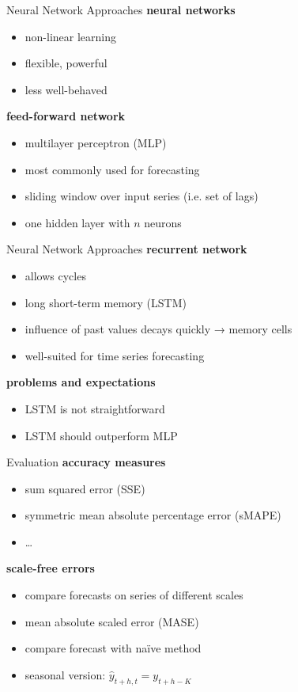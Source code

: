 \documentclass{beamer}
\begin{document}
  
  \begin{frame}{Neural Network Approaches}
    \textbf{neural networks}
    \begin{itemize}
     \item non-linear learning
     \item flexible, powerful
     \item less well-behaved
    \end{itemize}
    
    \textbf{feed-forward network}
    \begin{itemize}
     \item multilayer perceptron (MLP) 
     \item most commonly used for forecasting
     \item sliding window over input series (i.e. set of lags)
     \item one hidden layer with \(n\) neurons
    \end{itemize}
  \end{frame}

  
  \begin{frame}{Neural Network Approaches}
    \textbf{recurrent network}
    \begin{itemize}
     \item allows cycles
     \item long short-term memory (LSTM)
     \item influence of past values decays quickly → memory cells
     \item well-suited for time series forecasting
    \end{itemize}
    
    \textbf{problems and expectations}
    \begin{itemize}
     \item LSTM is not straightforward
     \item LSTM should outperform MLP
    \end{itemize}
  \end{frame}

  
  \begin{frame}{Evaluation}
    \textbf{accuracy measures}
    \begin{itemize}
     \item sum squared error (SSE)
     \item symmetric mean absolute percentage error (sMAPE)
     \item \ldots
    \end{itemize}
   
    \textbf{scale-free errors}
    \begin{itemize}
     \item compare forecasts on series of different scales 
     \item mean absolute scaled error (MASE)
     \item compare forecast with naïve method 
     \item seasonal version: \(\hat{y}_{t+h,t} = y_{t+h-K}\) %
    \end{itemize}
  \end{frame}

  
\end{document}
